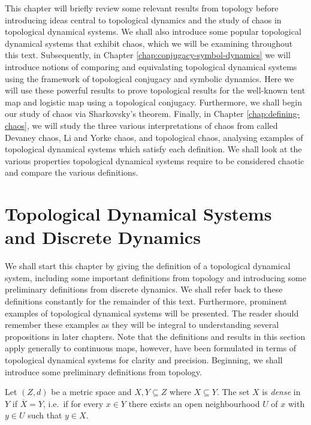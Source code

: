 This chapter will briefly review some relevant results from topology before introducing ideas central to topological dynamics and the study of chaos in topological dynamical systems. We shall also introduce some popular topological dynamical systems that exhibit chaos, which we will be examining throughout this text. Subsequently, in Chapter \ref{chap:conjugacy-symbol-dynamics} we will introduce notions of comparing and equivalating topological dynamical systems using the framework of topological conjugacy and symbolic dynamics. Here we will use these powerful results to prove topological results for the well-known tent map and logistic map using a topological conjugacy. Furthermore, we shall begin our study of chaos via Sharkovsky's theorem. Finally, in Chapter \ref{chap:defining-chaos}, we will study the three various interpretations of chaos from called Devaney chaos, Li and Yorke chaos, and topological chaos, analysing examples of topological dynamical systems which satisfy each definition. We shall look at the various properties topological dynamical systems require to be considered chaotic and compare the various definitions.

\section{Topological Dynamical Systems and Discrete Dynamics} \label{sec:topological-dynamical-systems}
We shall start this chapter by giving the definition of a topological dynamical system, including some important definitions from topology and introducing some preliminary definitions from discrete dynamics. We shall refer back to these definitions constantly for the remainder of this text. Furthermore, prominent examples of topological dynamical systems will be presented. The reader should remember these examples as they will be integral to understanding several propositions in later chapters. Note that the definitions and results in this section apply generally to continuous maps, however, have been formulated in terms of topological dynamical systems for clarity and precision. Beginning, we shall introduce some preliminary definitions from topology.

\begin{defn} \label{defn:dense}
    Let $(Z, d)$ be a metric space and $X, Y \subseteq Z$ where $X \subseteq Y$. The set $X$ is \emph{dense} in $Y$ if $\overline{X} = Y$, i.e.\ if for every $x \in Y$ there exists an open neighbourhood $U$ of $x$ with $y \in U$ such that $y \in X$.
\end{defn}

